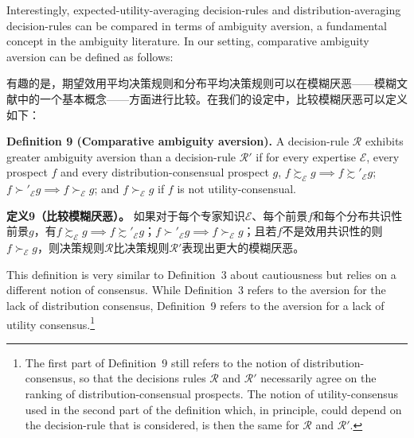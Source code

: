 \documentclass[12pt,a4paper]{article}
\newenvironment{original}
  {\par\noindent\ignorespaces}
  {\par}
\newenvironment{translation}
  {\par\noindent{\color{transblue}\ignorespaces}}
  {\par\medskip}
\begin{document}
\begin{original}
Interestingly, expected-utility-averaging decision-rules and distribution-averaging decision-rules can be compared in terms of ambiguity aversion, a fundamental concept in the ambiguity literature. In our setting, comparative ambiguity aversion can be defined as follows:
\end{original}

\begin{translation}
有趣的是，期望效用平均决策规则和分布平均决策规则可以在模糊厌恶——模糊文献中的一个基本概念——方面进行比较。在我们的设定中，比较模糊厌恶可以定义如下：
\end{translation}

\begin{original}
\textbf{Definition 9 (Comparative ambiguity aversion).} A decision-rule $\mathcal{R}$ exhibits greater ambiguity aversion than a decision-rule $\mathcal{R}'$ if for every expertise $\mathcal{E}$, every prospect $f$ and every distribution-consensual prospect $g$, $f \succsim_{\mathcal{E}} g \implies f \succsim'_{\mathcal{E}} g$; $f \succ'_{\mathcal{E}} g \implies f \succ_{\mathcal{E}} g$; and $f \succ_{\mathcal{E}} g$ if $f$ is not utility-consensual.
\end{original}

\begin{translation}
\textbf{定义9（比较模糊厌恶）。} 如果对于每个专家知识$\mathcal{E}$、每个前景$f$和每个分布共识性前景$g$，有$f \succsim_{\mathcal{E}} g \implies f \succsim'_{\mathcal{E}} g$；$f \succ'_{\mathcal{E}} g \implies f \succ_{\mathcal{E}} g$；且若$f$不是效用共识性的则$f \succ_{\mathcal{E}} g$，则决策规则$\mathcal{R}$比决策规则$\mathcal{R}'$表现出更大的模糊厌恶。
\end{translation}

\begin{original}
This definition is very similar to Definition~3 about cautiousness but relies on a different notion of consensus. While Definition~3 refers to the aversion for the lack of distribution consensus, Definition~9 refers to the aversion for a lack of utility consensus.\footnote{The first part of Definition~9 still refers to the notion of distribution-consensus, so that the decisions rules $\mathcal{R}$ and $\mathcal{R}'$ necessarily agree on the ranking of distribution-consensual prospects. The notion of utility-consensus used in the second part of the definition which, in principle, could depend on the decision-rule that is considered, is then the same for $\mathcal{R}$ and $\mathcal{R}'$.}
\end{original}
\end{document}
